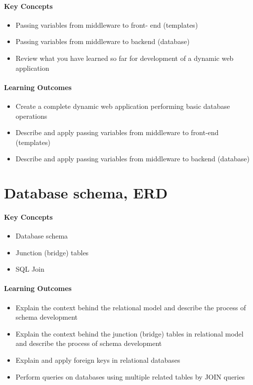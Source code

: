 \begin{mdframed}
\paragraph{Key Concepts}
\begin{itemize}[label={\checkmark}]
\item Passing variables from middleware to front- end (templates)
\item Passing variables from middleware to backend (database)
\item Review what you have learned so far for development of a dynamic web application
\end{itemize}

\paragraph{Learning Outcomes}
\begin{itemize}[label={\checkmark}]
\item Create a complete dynamic web application performing basic database operations
\item Describe and apply passing variables from middleware to front-end (templates)
\item Describe and apply passing variables from middleware to backend (database)
\end{itemize}
\end{mdframed}


\section{Database schema, ERD}

\begin{mdframed}

\paragraph{Key Concepts}
\begin{itemize}[label={\checkmark}]
\item Database schema
\item Junction (bridge) tables
\item SQL Join
\end{itemize}

\paragraph{Learning Outcomes}
\begin{itemize}[label={\checkmark}]
\item Explain the context behind the relational model and describe the process of schema development
\item Explain the context behind the junction (bridge) tables in relational model and describe the process of schema development
\item Explain and apply foreign keys in relational databases
\item Perform queries on databases using multiple related tables by JOIN queries
\end{itemize}
\end{mdframed}

